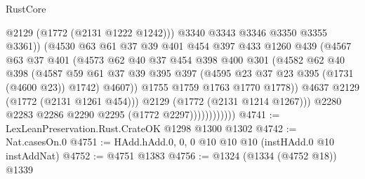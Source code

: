 \begin{lexlean}{RustCore}
\begin{coremodule}
                                  @2129
                                  (@1772 (@2131 @1222 @1242)))
                                @3340
                                @3343
                                @3346
                                @3350
                                @3355
                                @3361))
                            (@4530
                              @63
                              @61
                              @37
                              @39
                              @401
                              @454
                              @397
                              @433
                              @1260
                              @439
                              (@4567
                                @63
                                @37
                                @401
                                (@4573
                                  @62
                                  @40
                                  @37
                                  @454
                                  @398
                                  @400
                                  @301
                                  (@4582
                                    @62
                                    @40
                                    @398
                                    (@4587
                                      @59
                                      @61
                                      @37
                                      @39
                                      @395
                                      @397
                                      (@4595 @23 @37 @23 @395 (@1731 (@4600 @23)) @1742)
                                      @4607))
                                  @1755
                                  @1759
                                  @1763
                                  @1770
                                  @1778))
                              @4637
                              @2129
                              (@1772 (@2131 @1261 @454)))
                            @2129
                            (@1772 (@2131 @1214 @1267)))
                          @2280
                          @2283
                          @2286
                          @2290
                          @2295
                          (@1772 @2297))))))))))))
@4741 := LexLeanPreservation.Rust.CrateOK @1298 @1300 @1302
@4742 := Nat.casesOn.{0}
@4751 := HAdd.hAdd.{0, 0, 0} @10 @10 @10 (instHAdd.{0} @10 instAddNat)
@4752 := @4751 @1383
@4756 := @1324 (@1334 (@4752 @18)) @1339

\end{coremodule}
\end{lexlean}
